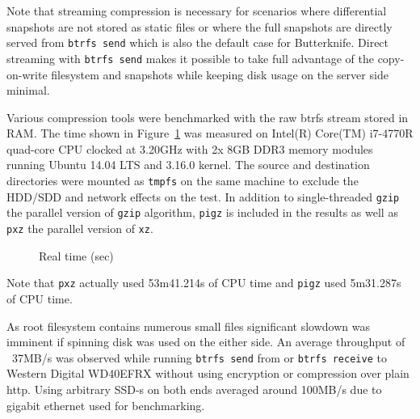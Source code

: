 \documentclass[a4paper,11pt]{kth-mag}
\begin{document}
Note that streaming compression is necessary for scenarios
where differential snapshots are not stored as static files
or where the full snapshots are directly served from
\lstinline!btrfs send! which is also the default case for Butterknife.
Direct streaming with \lstinline!btrfs send! makes it possible
to take full advantage of the copy-on-write filesystem
and snapshots while keeping disk usage on the server side minimal.

Various compression tools were benchmarked with
the raw \acrshort{btrfs} stream stored in RAM.
The time shown in Figure~\ref{fig:compression-benchmark-real-time}
was measured on Intel(R) Core(TM) i7-4770R quad-core CPU
clocked at 3.20GHz with 2x 8GB DDR3 memory modules running
Ubuntu 14.04 LTS and 3.16.0 kernel.
The source and destination directories were
mounted as \lstinline!tmpfs! on the same
machine to exclude the
HDD/SDD and network effects on the test.
In addition to single-threaded \lstinline!gzip!
the parallel version of \lstinline!gzip! algorithm,
\lstinline!pigz! is included in the results as well as \lstinline!pxz!
the parallel version of \lstinline!xz!.
\\

\begin{figure}
\caption{Real time (sec)}
\label{fig:compression-benchmark-real-time}
\end{figure}

Note that \lstinline!pxz! actually used 53m41.214s of CPU time
and \lstinline!pigz! used 5m31.287s of CPU time.

As root filesystem contains numerous small files significant
slowdown was imminent if spinning disk was used on the either side.
An average throughput of ~37MB/s was observed while
running \lstinline!btrfs send! from or \lstinline!btrfs receive! to
Western Digital WD40EFRX without using encryption or compression
over plain \acrshort{http}.
Using arbitrary SSD-s on both ends averaged around 100MB/s
due to gigabit ethernet used for benchmarking.
\end{document}
